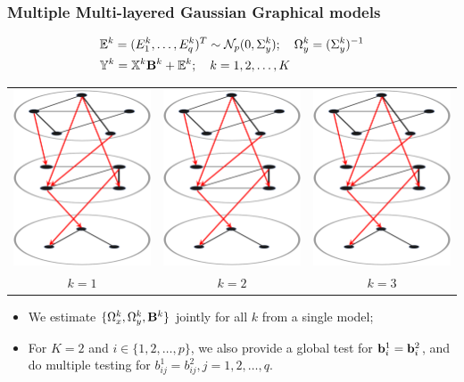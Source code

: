 \documentclass[10pt]{beamer}
\theoremstyle{definition}
\begin{document}
\begin{frame}
\frametitle{Multiple Multi-layered Gaussian Graphical models}

%
\begin{align*}
& {\mathbb{E}}^k = (E_1^k, \ldots, E_q^k)^T \sim {\cal{N}}_p (0, \Sigma_y^k); \quad
\Omega_y^k = (\Sigma_y^k)^{-1}\\
& {\mathbb{Y}}^k = {\mathbb{X}}^k {\mathbf{B}}^k + {\mathbb{E}}^k; \quad k = 1, 2, \ldots, K
\end{align*}
%

\begin{tabular}{ccc}
\hspace{1em} \includegraphics[width=.25\textwidth]{formulation_5} \hspace{1em} &
\includegraphics[width=.25\textwidth]{formulation_5} \hspace{1em} &
\includegraphics[width=.25\textwidth]{formulation_5} \hspace{1em} \\
$k=1$ & $k=2$ & $k=3$
\end{tabular}

\vspace{1em}
\begin{itemize}
\item We estimate $\{ \Omega_x^k, \Omega_y^k, {\mathbf{B}}^k \}$ jointly for all $k$ from a single model;

\item For $K=2$ and $i \in \{ 1, 2, \ldots, p\}$, we also provide a global test for ${\bf{b}}_i^1 = {\bf{b}}_i^2$, and do multiple testing for $b_{ij}^1 = b_{ij}^2, j = 1, 2, \ldots, q$.
\end{itemize}

\end{frame}
\end{document}

